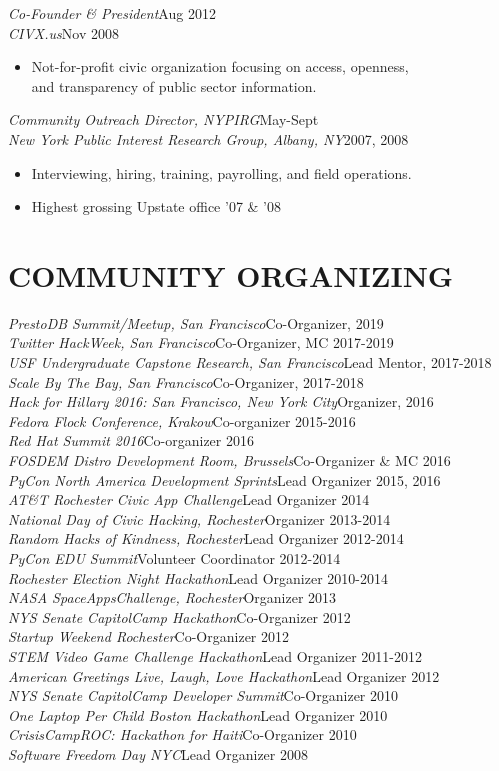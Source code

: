 \documentclass[margin]{res}
\newcommand{\event}[2]{{\it #1}\hfill #2\\}
\newcommand{\wherewhen}[2]{{\sl #1}\hfill #2}
\begin{document}
\begin{resume}
    \wherewhen{Co-Founder \& President}{Aug 2012}\\
    \wherewhen{CIVX.us}{Nov 2008}
    \begin{itemize}
        \item Not-for-profit civic organization focusing on access, openness, \\
            and transparency of public sector information.
    \end{itemize}

    \wherewhen{Community Outreach Director, NYPIRG}{May-Sept}\\
    \wherewhen{New York Public Interest Research Group, Albany, NY}{2007, 2008}
    \begin{itemize}
        \item Interviewing, hiring, training, payrolling, and field operations.
        \item Highest grossing Upstate office '07 \& '08
    \end{itemize}

\section{COMMUNITY ORGANIZING}
    \event{PrestoDB Summit/Meetup, San Francisco}{Co-Organizer, 2019}
    \event{Twitter HackWeek, San Francisco}{Co-Organizer, MC 2017-2019}
    \event{USF Undergraduate Capstone Research, San Francisco}{Lead Mentor, 2017-2018}
    \event{Scale By The Bay, San Francisco}{Co-Organizer, 2017-2018}
    \event{Hack for Hillary 2016: San Francisco, New York City}{Organizer, 2016}
    \event{Fedora Flock Conference, Krakow}{Co-organizer 2015-2016}
    \event{Red Hat Summit 2016}{Co-organizer 2016}
    \event{FOSDEM Distro Development Room, Brussels}{Co-Organizer \& MC 2016}
    \event{PyCon North America Development Sprints}{Lead Organizer 2015, 2016}
    \event{AT\&T Rochester Civic App Challenge}{Lead Organizer 2014}
    \event{National Day of Civic Hacking, Rochester}{Organizer 2013-2014}
    \event{Random Hacks of Kindness, Rochester}{Lead Organizer 2012-2014}
    \event{PyCon EDU Summit}{Volunteer Coordinator 2012-2014}
    \event{Rochester Election Night Hackathon}{Lead Organizer 2010-2014}
    \event{NASA SpaceAppsChallenge, Rochester}{Organizer 2013}
    \event{NYS Senate CapitolCamp Hackathon}{Co-Organizer 2012}
    \event{Startup Weekend Rochester}{Co-Organizer 2012}
    \event{STEM Video Game Challenge Hackathon}{Lead Organizer 2011-2012}
    \event{American Greetings Live, Laugh, Love Hackathon}{Lead Organizer 2012}
    \event{NYS Senate CapitolCamp Developer Summit}{Co-Organizer 2010}
    \event{One Laptop Per Child Boston Hackathon}{Lead Organizer 2010}
    \event{CrisisCampROC: Hackathon for Haiti}{Co-Organizer 2010}
    \event{Software Freedom Day NYC}{Lead Organizer 2008}


\end{resume}
\end{document}
